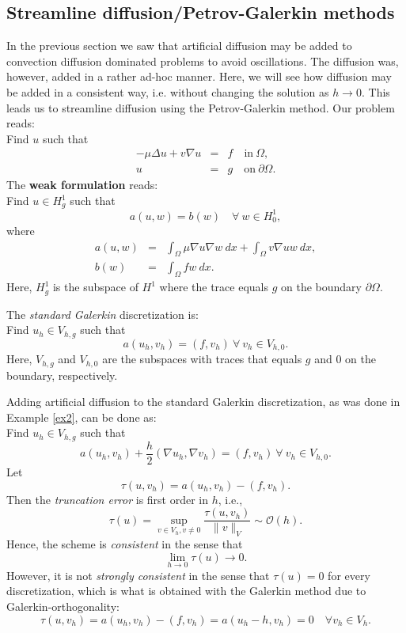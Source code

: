 \documentclass[a4paper,11pt]{amsart}
\begin{document}
\subsection{Streamline diffusion/Petrov-Galerkin methods}
In the previous section we saw that artificial diffusion may be added to convection diffusion dominated problems to avoid 
oscillations. The diffusion was, however, added in a rather ad-hoc manner.  
Here, we will see how diffusion may be added in a consistent way, 
i.e. without changing the solution as $h\rightarrow 0$. 
This leads us to streamline diffusion using the Petrov-Galerkin method.
Our problem reads: \\ 
Find $u$ such that 
\begin{eqnarray*}
-\mu\Delta u + v\nabla u &=& f \quad \textrm{in}\ \Omega, \\
u&=& g \quad \textrm{on}\ \partial\Omega .
\end{eqnarray*}
The \textbf{weak formulation} reads: \\
Find $u\in H_g^1$ such that 
\[
a(u,w) = b(w) \quad \forall\ w\in H_0^1, 
\]
where
\begin{eqnarray*}
a(u,w) &=& \int_\Omega\mu\nabla u\nabla w\ dx + \int_\Omega v\nabla uw\ dx,   \\
b(w) &=& \int_\Omega fw\ dx . 
\end{eqnarray*}
Here, $H_g^1$ is the subspace of $H^1$ where the trace equals $g$ on the boundary $\partial \Omega$.  

The \textit{standard Galerkin} discretization is: \\
Find $u_h\in V_{h,g}$ such that 
\begin{equation}
\label{Galerkin}
a(u_h, v_h) = (f,v_h)\ \forall\ v_h\in V_{h,0}.
\end{equation}
Here, $V_{h,g}$  and $V_{h,0}$ are the subspaces with traces that equals $g$ and $0$ on 
the boundary, respectively.  

Adding artificial diffusion 
to the standard Galerkin discretization, 
as was done in Example \ref{ex2}, 
can be done as: \\ 
Find $u_h\in V_{h,g}$ such that 
\[
a(u_h, v_h) + \frac{h}{2}(\nabla u_h, \nabla v_h)  = (f,v_h)\ \forall\ v_h\in V_{h,0}.
\]
Let
\[
\tau(u, v_h) =  a(u_h, v_h) - (f,v_h). 
\]
Then the \emph{truncation error} is first order in $h$, i.e., 
\[
\tau(u) = \sup_{v \in V_h, v \not = 0} \frac{\tau (u, v_h)}{\|v\|_{V}} \sim \mathcal{O}(h). 
\]
Hence, the scheme is \emph{consistent} in the sense that 
\[
\lim_{h\rightarrow 0} \tau (u) \rightarrow 0 .  
\]
However, it is not \emph{strongly consistent} in the sense that $\tau(u) = 0$ for every
discretization, which is what is obtained with the Galerkin method due
to Galerkin-orthogonality:   
\[
\tau(u, v_h) =  a(u_h, v_h) - (f,v_h) = a(u_h - h, v_h) = 0 \quad \forall v_h \in V_h. 
\]
\end{document}
